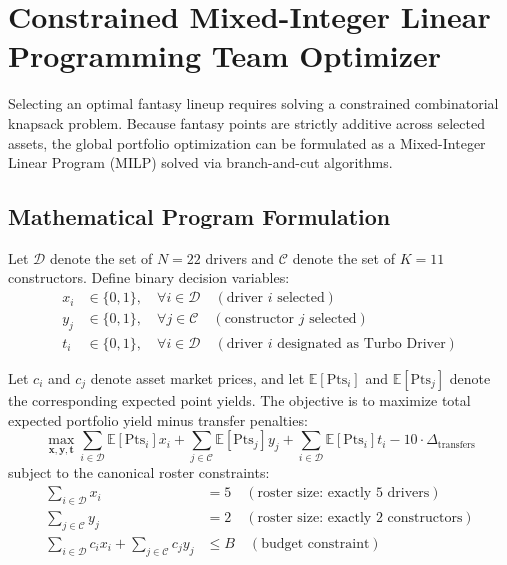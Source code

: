 \section{Constrained Mixed-Integer Linear Programming Team Optimizer}
\label{sec:integer_programming_optimizer}

Selecting an optimal fantasy lineup requires solving a constrained combinatorial knapsack problem. Because fantasy points are strictly additive across selected assets, the global portfolio optimization can be formulated as a Mixed-Integer Linear Program (MILP) solved via branch-and-cut algorithms.

\subsection{Mathematical Program Formulation}
Let $\mathcal{D}$ denote the set of $N = 22$ drivers and $\mathcal{C}$ denote the set of $K = 11$ constructors. Define binary decision variables:
\begin{align}
x_i &\in \{0, 1\}, \quad \forall i \in \mathcal{D} \quad (\text{driver } i \text{ selected}) \\
y_j &\in \{0, 1\}, \quad \forall j \in \mathcal{C} \quad (\text{constructor } j \text{ selected}) \\
t_i &\in \{0, 1\}, \quad \forall i \in \mathcal{D} \quad (\text{driver } i \text{ designated as Turbo Driver})
\end{align}

Let $c_i$ and $c_j$ denote asset market prices, and let $\mathbb{E}[\text{Pts}_i]$ and $\mathbb{E}[\text{Pts}_j]$ denote the corresponding expected point yields. The objective is to maximize total expected portfolio yield minus transfer penalties:
\begin{equation}
\max_{\mathbf{x}, \mathbf{y}, \mathbf{t}} \sum_{i \in \mathcal{D}} \mathbb{E}[\text{Pts}_i] x_i + \sum_{j \in \mathcal{C}} \mathbb{E}[\text{Pts}_j] y_j + \sum_{i \in \mathcal{D}} \mathbb{E}[\text{Pts}_i] t_i - 10 \cdot \Delta_{\text{transfers}}
\label{eq:milp_objective}
\end{equation}
subject to the canonical roster constraints:
\begin{align}
\sum_{i \in \mathcal{D}} x_i &= 5 \quad (\text{roster size: exactly 5 drivers}) \label{eq:driver_count} \\
\sum_{j \in \mathcal{C}} y_j &= 2 \quad (\text{roster size: exactly 2 constructors}) \label{eq:ctor_count} \\
\sum_{i \in \mathcal{D}} c_i x_i + \sum_{j \in \mathcal{C}} c_j y_j &\le B \quad (\text{budget constraint}) \label{eq:budget_limit}
\end{align}

